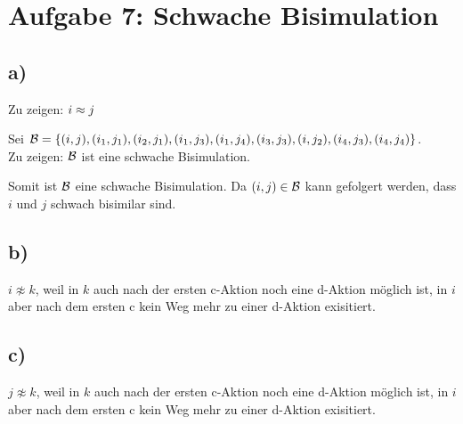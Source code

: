 \section*{Aufgabe 7: Schwache Bisimulation}

\subsection*{a)}
Zu zeigen: $i \approx j$

Sei $\mathbin{\mathcal{B}} = \{(i,j),(i_1,j_1),(i_2,j_1),(i_1,j_3),(i_1,j_4),(i_3,j_3),(i,j_2),(i_4,j_3),(i_4,j_4)\}$. \\
Zu zeigen: $\mathbin{\mathcal{B}}$ ist eine schwache Bisimulation.

\begin{compactitem}
\item {}
\item {}
\item {}
\item {}
\item {}
\item {}
\item {}
\item {}
\item {}
\end{compactitem}
Somit ist $\mathbin{\mathcal{B}}$ eine schwache Bisimulation. Da $(i, j) \in \mathbin{\mathcal{B}}$ kann gefolgert werden, dass $i$ und $j$ schwach bisimilar sind.

\subsection*{b)} $i \not\approx k$, weil in $k$ auch nach der ersten c-Aktion noch eine d-Aktion möglich ist, in $i$ aber nach dem ersten c kein Weg mehr zu einer d-Aktion exisitiert.

\subsection*{c)} $j \not\approx k$, weil in $k$ auch nach der ersten c-Aktion noch eine d-Aktion möglich ist, in $i$ aber nach dem ersten c kein Weg mehr zu einer d-Aktion exisitiert.
